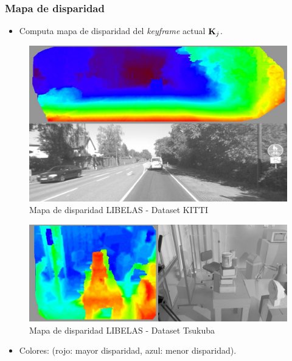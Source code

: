 \documentclass[compress]{beamer}
\begin{document}
\begin{frame}
	\frametitle{Mapa de disparidad}

	\begin{itemize}
		\item Computa mapa de disparidad del \emph{keyframe} actual $\boldsymbol{\mathbf{K}}_{j}$.
	\end{itemize}
	
	\begin{figure}[htb]
		\centering
		\includegraphics[width=0.4\columnwidth]{method/libelas_merge_kitti04_22.jpg}
		\caption{Mapa de disparidad LIBELAS - Dataset KITTI}
	\end{figure}

	\vspace{-1em}

	\begin{figure}[htb]
		\centering
		\includegraphics[width=0.4\columnwidth]{method/libelas_merge_tsukuba_222.jpg}
		\caption{Mapa de disparidad LIBELAS - Dataset Tsukuba}
	\end{figure}

	\begin{itemize}
		\item Colores: (rojo: mayor disparidad, azul: menor disparidad).
	\end{itemize}
	
\end{frame}
\end{document}
